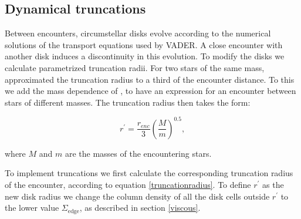 \documentclass[fleqn,usenatbib]{mnras}
\begin{document}
\subsection{Dynamical truncations}\label{truncations_dynamical}
Between encounters, circumstellar disks evolve according to the numerical solutions of the transport equations used by VADER. A close encounter with another disk induces a discontinuity in this evolution. To modify the disks we calculate parametrized truncation radii. For two stars of the same mass, \citet{rosotti2014} approximated the truncation radius to a third of the encounter distance. To this we add the mass dependence of \citet{bhandare2016}, to have an expression for an encounter between stars of different masses. The truncation radius then takes the form:

\begin{equation}\label{truncationradius}
{r^\prime} = \frac{r_{enc}}{3}\left(\frac{M}{m}\right)^{0.5},
\end{equation}

\noindent 
where $M$ and $m$ are the masses of the encountering stars.

To implement truncations we first calculate the corresponding truncation radius of the encounter, according to equation \ref{truncationradius}. To define $r^\prime$ as the new disk radius we change the column density of all the disk cells outside $r^\prime$ to the lower value $\Sigma_{\mathrm{edge}}$, as described in section \ref{viscous}.





\end{document}
